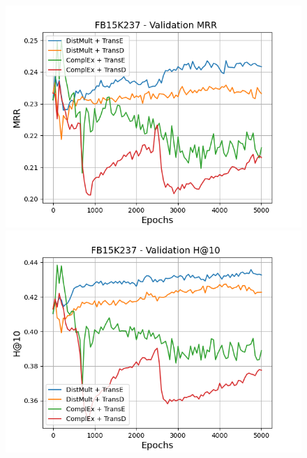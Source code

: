 \begin{figure}
    \centering
    \begin{minipage}{.45\textwidth}
      \centering
      \includegraphics[width=0.9\linewidth]{figures/results/gan_train/pretrained/uncertainty/max/entropy/fb15k237/5k_epochs/uncertainty_fb15k237_mrrs.png}
    \end{minipage}%
    \begin{minipage}{.45\textwidth}
      \centering
      \includegraphics[width=0.9\linewidth]{figures/results/gan_train/pretrained/uncertainty/max/entropy/fb15k237/5k_epochs/uncertainty_fb15k237_hit10.png}
    \end{minipage}
    

\end{figure}
